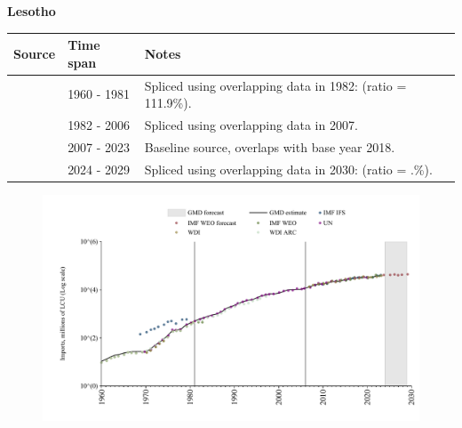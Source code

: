\documentclass[12pt,a4paper,landscape]{article}
\begin{document}
\begin{adjustbox}{max totalsize={\paperwidth}{\paperheight},center}
\begin{minipage}[t][\textheight][t]{\textwidth}
\vspace*{0.5cm}
{}
\begin{center}
{\Large\bfseries Lesotho}
\end{center}
\vspace{0.5cm}
\begin{table}[H]
\centering
\small
\begin{tabular}{|l|l|l|}
\hline
\textbf{Source} & \textbf{Time span} & \textbf{Notes} \\
\hline
\rowcolor{white}\cite{WDI}& 1960 - 1981 &Spliced using overlapping data in 1982: (ratio = 111.9\%).\\
\rowcolor{lightgray}\cite{UN}& 1982 - 2006 &Spliced using overlapping data in 2007.\\
\rowcolor{white}\cite{WDI}& 2007 - 2023 &Baseline source, overlaps with base year 2018.\\
\rowcolor{lightgray}\cite{IMF_WEO_forecast}& 2024 - 2029 &Spliced using overlapping data in 2030: (ratio = .\%).\\
\hline
\end{tabular}
\end{table}
\begin{figure}[H]
\centering
\includegraphics[width=\textwidth,height=0.6\textheight,keepaspectratio]{graphs/LSO_imports.pdf}
\end{figure}
\end{minipage}
\end{adjustbox}
\end{document}
